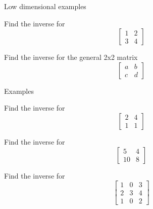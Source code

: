 \documentclass{beamer}
\begin{document}
\begin{frame}{Low dimensional examples}
  \begin{example}
    Find the inverse for
    \begin{equation*}
      \left[
        \begin{array}{cc}
          1&2\\
          3&4
        \end{array}
      \right]
    \end{equation*}
  \end{example}
  \begin{example}
    Find the inverse for the general 2x2 matrix
    \begin{equation*}
      \left[
        \begin{array}{cc}
          a&b\\
          c&d
        \end{array}
      \right]
    \end{equation*}
  \end{example}
\end{frame}

\begin{frame}{Examples}
  \begin{example}
    Find the inverse for
    \begin{equation*}
      \left[
        \begin{array}{cc}
          2&4\\
          1&1
        \end{array}
      \right]
    \end{equation*}
  \end{example}
  \begin{example}
    Find the inverse for
    \begin{equation*}
      \left[
        \begin{array}{cc}
          5&4\\
          10&8
        \end{array}
      \right]
    \end{equation*}
  \end{example}
  \begin{example}
    Find the inverse for
    \begin{equation*}
      \left[
        \begin{array}{ccc}
          1&0&3\\
          2&3&4\\
          1&0&2
        \end{array}
      \right]
    \end{equation*}
  \end{example}
\end{frame}
\end{document}
